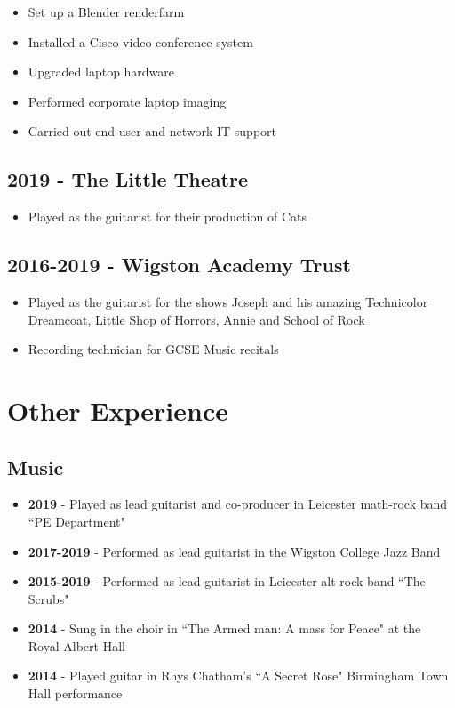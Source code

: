 \documentclass{article}
\begin{document}
\begin{itemize}[noitemsep]

\item Set up a Blender renderfarm
\item Installed a Cisco video conference system 
\item Upgraded laptop hardware
\item Performed corporate laptop imaging
\item Carried out end-user and network IT support

\end{itemize}

\subsection{2019 - The Little Theatre}
\begin{itemize}[noitemsep]

\item Played as the guitarist for their production of Cats

\end{itemize}


\subsection{2016-2019 - Wigston Academy Trust}
\begin{itemize}[noitemsep]

\item Played as the guitarist for the shows Joseph and his amazing Technicolor Dreamcoat, Little Shop of Horrors, Annie and School of Rock
\item Recording technician for GCSE Music recitals

\end{itemize}


\section{Other Experience}
\subsection{Music}
\begin{itemize}[noitemsep]

\item \textbf{2019} - Played as lead guitarist and co-producer in Leicester math-rock band ``PE Department"
\item \textbf{2017-2019} - Performed as lead guitarist in the Wigston College Jazz Band
\item \textbf{2015-2019} - Performed as lead guitarist in Leicester alt-rock band ``The Scrubs"
\item \textbf{2014} - Sung in the choir in ``The Armed man: A mass for Peace" at the Royal Albert Hall
\item \textbf{2014} - Played guitar in Rhys Chatham's ``A Secret Rose" Birmingham Town Hall performance

\end{itemize}
\end{document}
